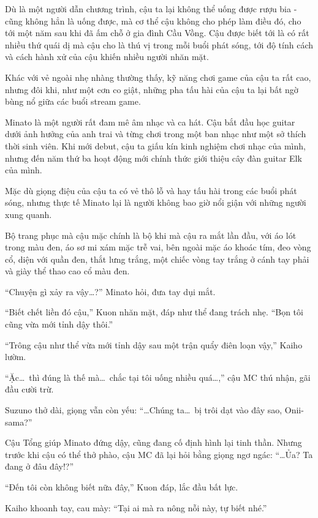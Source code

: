 \documentclass[../main.tex]{subfiles}
\begin{document}
Dù là một người dẫn chương trình, cậu ta lại không thể uống được rượu bia - cũng không hẳn là uống được, mà cơ thể cậu không cho phép làm điều đó, cho tới một năm sau khi đã ấm chỗ ở gia đình Cầu Vồng. Cậu được biết tới là có rất nhiều thứ quái dị mà cậu cho là thú vị trong mỗi buổi phát sóng, tới độ tính cách và cách hành xử của cậu khiến nhiều người nhăn mặt.

Khác với vẻ ngoài nhẹ nhàng thường thấy, kỹ năng chơi game của cậu ta rất cao, nhưng đôi khi, như một cơn co giật, những pha tấu hài của cậu ta lại bất ngờ bùng nổ giữa các buổi stream game.

Minato là một người rất đam mê âm nhạc và ca hát. Cậu bắt đầu học guitar dưới ảnh hưởng của anh trai và từng chơi trong một ban nhạc như một sở thích thời sinh viên. Khi mới debut, cậu ta giấu kín kinh nghiệm chơi nhạc của mình, nhưng đến năm thứ ba hoạt động mới chính thức giới thiệu cây đàn guitar Elk của mình.

Mặc dù giọng điệu của cậu ta có vẻ thô lỗ và hay tấu hài trong các buổi phát sóng, nhưng thực tế Minato lại là người không bao giờ nổi giận với những người xung quanh.

Bộ trang phục mà cậu mặc chính là bộ khi mà cậu ra mắt lần đầu, với áo lót trong màu đen, áo sơ mi xám mặc trễ vai, bên ngoài mặc áo khoác tím, đeo vòng cổ, diện với quần đen, thắt lưng trắng, một chiếc vòng tay trắng ở cánh tay phải và giày thể thao cao cổ màu đen.

\chrint

``Chuyện gì xảy ra vậy\dots?'' Minato hỏi, đưa tay dụi mắt.

``Biết chết liền đó cậu,'' Kuon nhăn mặt, đáp như thể đang trách nhẹ. ``Bọn tôi cũng vừa mới tỉnh dậy thôi.''

``Trông cậu như thể vừa mới tỉnh dậy sau một trận quẩy điên loạn vậy,'' Kaiho lườm.

``Ặc\dots\ thì đúng là thế mà\dots\ chắc tại tôi uống nhiều quá\dots,'' cậu MC thú nhận, gãi đầu cười trừ.

Suzuno thở dài, giọng vẫn còn yếu: ``\dots Chúng ta\dots\ bị trôi dạt vào đây sao, Onii-sama?''

Cậu Tổng giúp Minato đứng dậy, cũng đang cố định hình lại tinh thần. Nhưng trước khi cậu có thể thở phào, cậu MC đã lại hỏi bằng giọng ngơ ngác: ``\dots Ủa? Ta đang ở đâu đây!?''

``Đến tôi còn không biết nữa đây,'' Kuon đáp, lắc đầu bất lực.

Kaiho khoanh tay, cau mày: ``Tại ai mà ra nông nỗi này, tự biết nhé.''
\end{document}
